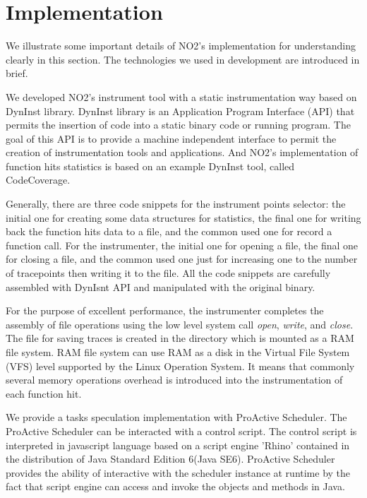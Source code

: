 \section{Implementation}

We illustrate some important details of NO2's implementation for understanding clearly in this section. The technologies we used in development are introduced in brief.

We developed NO2's instrument tool with a static instrumentation way based on DynInst library. DynInst library is an Application Program Interface (API) that permits the insertion of code into a static binary code or running program. The goal of this API is to provide a machine independent interface to permit the creation of instrumentation tools and applications. And NO2's implementation of function hits statistics is based on an example DynInst tool, called CodeCoverage.

Generally, there are three code snippets for the instrument points selector: the initial one for creating some data structures for statistics, the final one for writing back the function hits data to a file, and the common used one for record a function call. For the instrumenter, the initial one for opening a file, the final one for closing a file, and the common used one just for increasing one to the number of tracepoints then writing it to the file. All the code snippets are carefully assembled with DynIsnt API and manipulated with the original binary.

For the purpose of excellent performance, the instrumenter completes the assembly of file operations using the low level system call \emph{open}, \emph{write}, and \emph{close}. The file for saving traces is created in the directory which is mounted as a RAM file system. RAM file system can use RAM as a disk in the Virtual File System (VFS) level supported by the Linux Operation System. It means that commonly several memory operations overhead is introduced into the instrumentation of each function hit.

We provide a tasks speculation implementation with ProActive Scheduler. The ProActive Scheduler can be interacted with a control script. The control script is interpreted in javascript language based on a script engine 'Rhino' contained in the distribution of Java Standard Edition 6(Java SE6). ProActive Scheduler provides the ability of interactive with the scheduler instance at runtime by the fact that script engine can access and invoke the objects and methods in Java.

